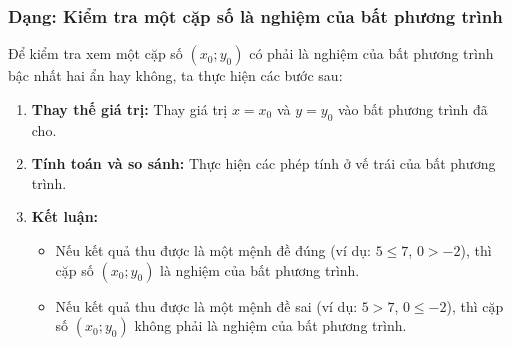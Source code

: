 \subsubsection{Dạng: Kiểm tra một cặp số là nghiệm của bất phương trình}
\begin{phuongphap}
Để kiểm tra xem một cặp số $(x_0; y_0)$ có phải là nghiệm của bất phương trình bậc nhất hai ẩn hay không, ta thực hiện các bước sau:
\begin{enumerate}
    \item \textbf{Thay thế giá trị:} Thay giá trị $x=x_0$ và $y=y_0$ vào bất phương trình đã cho.
    \item \textbf{Tính toán và so sánh:} Thực hiện các phép tính ở vế trái của bất phương trình.
    \item \textbf{Kết luận:}
    \begin{itemize}
        \item Nếu kết quả thu được là một mệnh đề đúng (ví dụ: $5 \le 7$, $0 > -2$), thì cặp số $(x_0; y_0)$ là nghiệm của bất phương trình.
        \item Nếu kết quả thu được là một mệnh đề sai (ví dụ: $5 > 7$, $0 \le -2$), thì cặp số $(x_0; y_0)$ không phải là nghiệm của bất phương trình.
    \end{itemize}
\end{enumerate}
\end{phuongphap}
